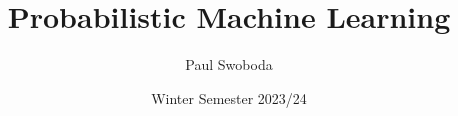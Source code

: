 \documentclass[8pt,handout,notheorems]{beamer}
\title{Probabilistic Machine Learning}
\author{Paul Swoboda}
\institute{HHU D\"usseldorf}
\date{Winter Semester 2023/24}
\theoremstyle{definition}
\theoremstyle{example}
\begin{document}
\frame{\titlepage}


%
%
%





\end{document}
